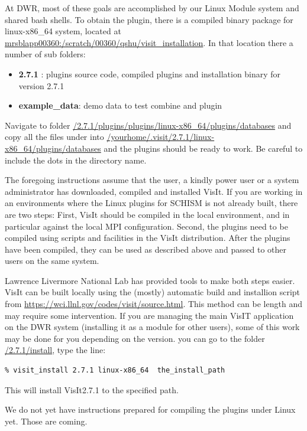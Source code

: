 \documentclass[12pt]{report}
\begin{document}
At DWR, most of these goals are accomplished by our Linux Module system and shared bash shells. 
To obtain the plugin, there is a compiled binary package for linux-x86\_64 system, 
located at \url{mrsblapp00360:/scratch/00360/qshu/visit_installation}. In that location there a number of sub folders:
\begin{itemize}
\item {\bf 2.7.1 }:        plugins source code, compiled plugins and installation binary for version 2.7.1
\item {\bf example\_data}:  demo data to test combine and plugin
\end{itemize}

Navigate to folder \url{/2.7.1/plugins/plugins/linux-x86\_64/plugins/databases} 
and copy all the files under into \url{/yourhome/.visit/2.7.1/linux-x86\_64/plugins/databases} 
and the plugins should be ready to work. Be careful to include the dots in the directory name.

The foregoing instructions assume that the user, a kindly power user 
or a system administrator has downloaded, compiled and installed VisIt.
If you are working in an environments where the Linux plugins for SCHISM is not already built, 
there are two steps: First, VisIt should be compiled in the local environment, and in particular
against the local MPI configuration. Second, the plugins need to be compiled using scripts and facilities in the VisIt distribution. 
After the plugins have been compiled, they can be used as described above and passed to other users on the same system.
 
Lawrence Livermore National Lab has provided tools to make both steps easier. VisIt can be built locally 
using the (mostly) automatic build and installion script from \url{https://wci.llnl.gov/codes/visit/source.html}. 
This method can be length and may require some intervention.      
If you are managing the main VisIT application on the DWR system (installing it as a module for other users), 
some of this work may be done for you depending on the version.
you can go to the folder \url{/2.7.1/install}, type the line:
\begin{verbatim}
% visit_install 2.7.1 linux-x86_64  the_install_path
\end{verbatim} 
This will install VisIt2.7.1  to the specified path. 

We do not yet have instructions prepared for compiling the plugins under Linux yet. Those are coming.
\end{document}
